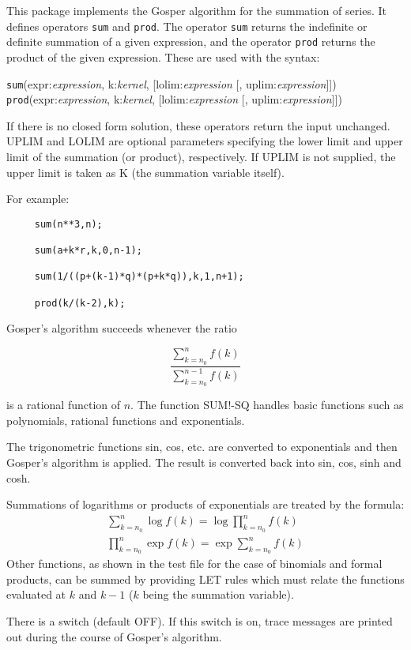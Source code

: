 
  
This package implements the Gosper algorithm for the summation of series.
It defines operators \texttt{sum} and \texttt{prod}.  The operator \texttt{sum} returns the indefinite
or definite summation of a given expression, and the operator \texttt{prod} returns
the product of the given expression.  These are used with the syntax:

\hypertarget{operator:SUM}{}
\hypertarget{operator:PROD}{}
\vspace{.1in}
\noindent \texttt{sum}(expr:{\em expression}, k:{\em kernel},
[lolim:{\em expression} [, uplim:{\em expression}]])
\vspace{.1in}
\noindent \texttt{prod}(expr:{\em expression}, k:{\em kernel},
[lolim:{\em expression} [, uplim:{\em expression}]])

If there is no closed form solution, these operators return the input
unchanged.  UPLIM and LOLIM are optional parameters specifying the lower
limit and upper limit of the summation (or product), respectively.  If UPLIM
is not supplied, the upper limit is taken as K (the summation variable
itself).

For example:

\begin{verbatim}
     sum(n**3,n);

     sum(a+k*r,k,0,n-1);

     sum(1/((p+(k-1)*q)*(p+k*q)),k,1,n+1);

     prod(k/(k-2),k);
\end{verbatim}

Gosper's algorithm succeeds whenever the ratio

\[ \frac{\sum_{k=n_0}^n f(k)}{\sum_{k=n_0}^{n-1} f(k)} \]

\noindent is a rational function of $n$.  The function SUM!-SQ
handles basic functions such as polynomials, rational functions and
exponentials. 

The trigonometric functions sin, cos, etc. are converted to exponentials
and then Gosper's algorithm is applied.  The result is converted back into
sin, cos, sinh and cosh.

Summations of logarithms or products of exponentials are treated by the
formula:
\begin{gather*}
  \sum_{k=n_0}^{n} \log f(k) = \log \prod_{k=n_0}^n f(k) \\
  \prod_{k=n_0}^n \exp f(k) = \exp \sum_{k=n_0}^n f(k)
\end{gather*}
Other functions, as shown in the test file for the case of binomials and
formal products, can be summed by providing LET rules which must relate the
functions evaluated at $k$ and $k - 1$ ($k$ being the summation variable).

 
\hypertarget{switch:TRSUM}{}
There is a switch  (default OFF).  If this switch is on, trace
messages are printed out during the course of Gosper's algorithm.

